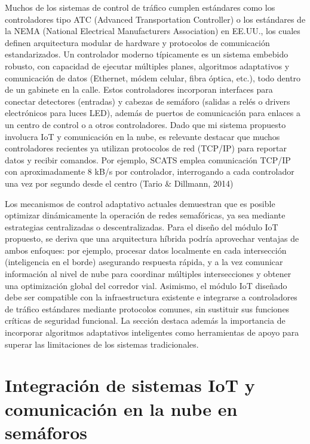 \documentclass[12pt,a4paper,oneside]{report}
\begin{document}
Muchos de los sistemas de control de tráfico cumplen estándares como los controladores tipo ATC (Advanced Transportation Controller) o los estándares de la NEMA (National Electrical Manufacturers Association) en EE.UU., los cuales definen arquitectura modular de hardware y protocolos de comunicación estandarizados. Un controlador moderno típicamente es un sistema embebido robusto, con capacidad de ejecutar múltiples planes, algoritmos adaptativos y comunicación de datos (Ethernet, módem celular, fibra óptica, etc.), todo dentro de un gabinete en la calle. Estos controladores incorporan interfaces para conectar detectores (entradas) y cabezas de semáforo (salidas a relés o drivers electrónicos para luces LED), además de puertos de comunicación para enlaces a un centro de control o a otros controladores. Dado que mi sistema propuesto involucra IoT y comunicación en la nube, es relevante destacar que muchos controladores recientes ya utilizan protocolos de red (TCP/IP) para reportar datos y recibir comandos. Por ejemplo, SCATS emplea comunicación TCP/IP con aproximadamente 8 kB/s por controlador, interrogando a cada controlador una vez por segundo desde el centro\hspace{0pt} (Tario \& Dillmann, 2014)

Los mecanismos de control adaptativo actuales demuestran que es posible optimizar dinámicamente la operación de redes semafóricas, ya sea mediante estrategias centralizadas o descentralizadas. Para el diseño del módulo IoT propuesto, se deriva que una arquitectura híbrida podría aprovechar ventajas de ambos enfoques: por ejemplo, procesar datos localmente en cada intersección (inteligencia en el borde) asegurando respuesta rápida, y a la vez comunicar información al nivel de nube para coordinar múltiples intersecciones y obtener una optimización global del corredor vial. Asimismo, el módulo IoT diseñado debe ser compatible con la infraestructura existente e integrarse a controladores de tráfico estándares mediante protocolos comunes, sin sustituir sus funciones críticas de seguridad funcional. La sección destaca además la importancia de incorporar algoritmos adaptativos inteligentes como herramientas de apoyo para superar las limitaciones de los sistemas tradicionales.

\section{Integración de sistemas IoT y comunicación en la nube en semáforos}\label{integraciuxf3n-de-sistemas-iot-y-comunicaciuxf3n-en-la-nube-en-semuxe1foros}
\end{document}
